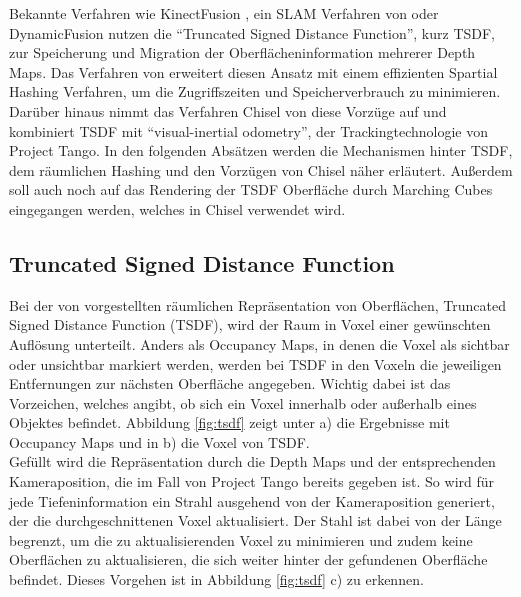 Bekannte Verfahren wie KinectFusion \citep{newcombe2011kinectfusion}, ein SLAM Verfahren von \citet{bylow2013real} oder DynamicFusion \citep{newcombe2015dynamicfusion} nutzen die \enquote{Truncated Signed Distance Function}, kurz TSDF, zur Speicherung und Migration der Oberflächeninformation mehrerer Depth Maps. Das Verfahren von \citet{niessner2013real} erweitert diesen Ansatz mit einem effizienten Spartial Hashing Verfahren, um die Zugriffszeiten und Speicherverbrauch zu minimieren. Darüber hinaus nimmt das Verfahren Chisel von \citep{Klingensmith_2015_7924} diese Vorzüge auf und kombiniert TSDF mit  \enquote{visual-inertial odometry}, der Trackingtechnologie von Project Tango. In den folgenden Absätzen werden die Mechanismen hinter TSDF, dem räumlichen Hashing und den Vorzügen von Chisel näher erläutert. Außerdem soll auch noch auf das Rendering der TSDF Oberfläche durch Marching Cubes eingegangen werden, welches in Chisel verwendet wird. \\


\subsection{Truncated Signed Distance Function}

Bei der von \citet{curless1996volumetric} vorgestellten räumlichen Repräsentation von Oberflächen, Truncated Signed Distance Function (TSDF), wird der Raum in Voxel einer gewünschten Auflösung unterteilt. Anders als Occupancy Maps, in denen die Voxel als sichtbar oder unsichtbar markiert werden, werden bei TSDF in den Voxeln die jeweiligen Entfernungen zur nächsten Oberfläche angegeben. Wichtig dabei ist das Vorzeichen, welches angibt, ob sich ein Voxel innerhalb oder außerhalb eines Objektes befindet. Abbildung \ref{fig:tsdf} zeigt unter a) die Ergebnisse mit Occupancy Maps und in b) die Voxel von TSDF. \citep{curless1996volumetric} \\

Gefüllt wird die Repräsentation durch die Depth Maps und der entsprechenden Kameraposition, die im Fall von Project Tango bereits gegeben ist. So wird für jede Tiefeninformation ein Strahl ausgehend von der Kameraposition generiert, der die durchgeschnittenen Voxel aktualisiert. Der Stahl ist dabei von der Länge begrenzt, um die zu aktualisierenden Voxel zu minimieren und zudem keine Oberflächen zu aktualisieren, die sich weiter hinter der gefundenen Oberfläche befindet. Dieses Vorgehen ist in Abbildung \ref{fig:tsdf} c) zu erkennen. \citep{Compu66:online} \\

